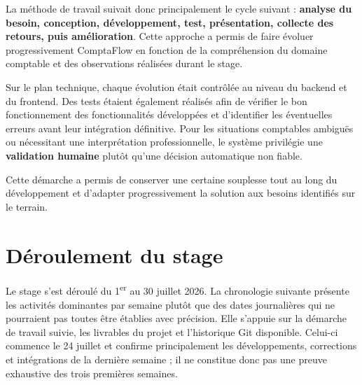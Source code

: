 \documentclass[12pt,a4paper,oneside]{report}
\begin{document}
La méthode de travail suivait donc principalement le cycle suivant : \textbf{analyse du besoin, conception, développement, test, présentation, collecte des retours, puis amélioration}. Cette approche a permis de faire évoluer progressivement ComptaFlow en fonction de la compréhension du domaine comptable et des observations réalisées durant le stage.

Sur le plan technique, chaque évolution était contrôlée au niveau du backend et du frontend. Des tests étaient également réalisés afin de vérifier le bon fonctionnement des fonctionnalités développées et d'identifier les éventuelles erreurs avant leur intégration définitive. Pour les situations comptables ambiguës ou nécessitant une interprétation professionnelle, le système privilégie une \textbf{validation humaine} plutôt qu'une décision automatique non fiable.

Cette démarche a permis de conserver une certaine souplesse tout au long du développement et d'adapter progressivement la solution aux besoins identifiés sur le terrain.

\section{Déroulement du stage}

Le stage s'est déroulé du 1\textsuperscript{er} au 30 juillet 2026. La
chronologie suivante présente les activités dominantes par semaine plutôt que
des dates journalières qui ne pourraient pas toutes être établies avec
précision. Elle s'appuie sur la démarche de travail suivie, les livrables du
projet et l'historique Git disponible. Celui-ci commence le 24 juillet et
confirme principalement les développements, corrections et intégrations de la
dernière semaine ; il ne constitue donc pas une preuve exhaustive des trois
premières semaines.
\end{document}
